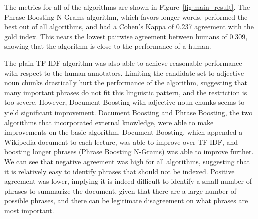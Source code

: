 The metrics for all of the algorithms are shown in
Figure~\ref{fig:main_result}. The Phrase Boosting N-Grams algorithm,
which favors longer words, performed the best out of all algorithms,
and had a Cohen's Kappa of 0.237 agreement with the gold index. This nears the
lowest pairwise agreement between humans of 0.309, showing that the
algorithm is close to the performance of a human.

The plain TF-IDF algorithm was also able to achieve reasonable
performance with respect to the human annotators. Limiting the
candidate set to adjective-noun chunks drastically hurt the
performance of the algorithm, suggesting that many important phrases
do not fit this linguistic pattern, and the restriction is too
severe. However, Document Boosting with adjective-noun chunks seems to
yield significant improvement. Document Boosting and Phrase Boosting, the two algorithms that
incorporated external knowledge, were able to make improvements on the
basic algorithm. Document Boosting, which appended a Wikipedia document to
each lecture, was able to improve over TF-IDF, and boosting
longer phrases (Phrase Boosting N-Grams) was able to improve
further. We can see that negative agreement was high for all
algorithms, suggesting that it is relatively easy to identify phrases
that should not be indexed. Positive agreement was lower, implying it is indeed difficult to identify a small number of phrases to summarize the document, given that there are a large number of possible phrases, and there can be legitimate disagreement on what phrases are most important.


